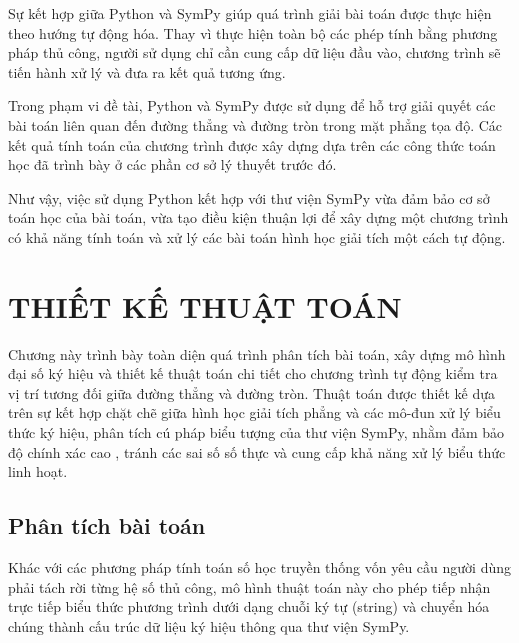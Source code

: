 \documentclass[12pt,a4paper]{article}
\begin{document}
Sự kết hợp giữa Python và SymPy giúp quá trình giải bài toán được thực hiện theo hướng tự động hóa. Thay vì thực hiện toàn bộ các phép tính bằng phương pháp thủ công, người sử dụng chỉ cần cung cấp dữ liệu đầu vào, chương trình sẽ tiến hành xử lý và đưa ra kết quả tương ứng.

Trong phạm vi đề tài, Python và SymPy được sử dụng để hỗ trợ giải quyết các bài toán liên quan đến đường thẳng và đường tròn trong mặt phẳng tọa độ. Các kết quả tính toán của chương trình được xây dựng dựa trên các công thức toán học đã trình bày ở các phần cơ sở lý thuyết trước đó.

Như vậy, việc sử dụng Python kết hợp với thư viện SymPy vừa đảm bảo cơ sở toán học của bài toán, vừa tạo điều kiện thuận lợi để xây dựng một chương trình có khả năng tính toán và xử lý các bài toán hình học giải tích một cách tự động.



\newpage

\section{ THIẾT KẾ THUẬT TOÁN}

Chương này trình bày toàn diện quá trình phân tích bài toán, xây dựng mô hình đại số ký hiệu và thiết kế thuật toán chi tiết cho chương trình tự động kiểm tra vị trí tương đối giữa đường thẳng và đường tròn. Thuật toán được thiết kế dựa trên sự kết hợp chặt chẽ giữa hình học giải tích phẳng và các mô-đun xử lý biểu thức ký hiệu, phân tích cú pháp biểu tượng của thư viện SymPy, nhằm đảm bảo độ chính xác cao , tránh các sai số số thực và cung cấp khả năng xử lý biểu thức linh hoạt.

\subsection{Phân tích bài toán}

Khác với các phương pháp tính toán số học truyền thống vốn yêu cầu người dùng phải tách rời từng hệ số thủ công, mô hình thuật toán này cho phép tiếp nhận trực tiếp biểu thức phương trình dưới dạng chuỗi ký tự (string) và chuyển hóa chúng thành cấu trúc dữ liệu ký hiệu thông qua thư viện SymPy.
\end{document}
